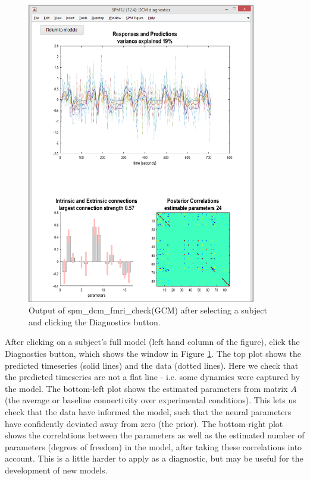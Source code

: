 \documentclass{article}
\begin{document}
\begin{figure}[ht]
\begin{center}
\includegraphics[width=10cm]{"Fig_spm_dcm_fmri_check_part2"}
\caption{Output of spm\_dcm\_fmri\_check(GCM) after selecting a subject and clicking the Diagnostics button.\label{Fig_spm_dcm_fmri_check_part2}}
\end{center}
\end{figure}

After clicking on a subject's full model (left hand column of the figure), click the Diagnostics button, which shows the window in Figure \ref{Fig_spm_dcm_fmri_check_part2}. The top plot shows the predicted timeseries (solid lines) and the data (dotted lines). Here we check that the predicted timeseries are not a flat line - i.e. some dynamics were captured by the model. The bottom-left plot shows the estimated parameters from matrix \(A\) (the average or baseline connectivity over experimental conditions). This lets us check that the data have informed the model, such that the neural parameters have confidently deviated away from zero (the prior). The bottom-right plot shows the correlations between the parameters as well as the estimated number of parameters (degrees of freedom) in the model, after taking these correlations into account. This is a little harder to apply as a diagnostic, but may be useful for the development of new models.
\end{document}
